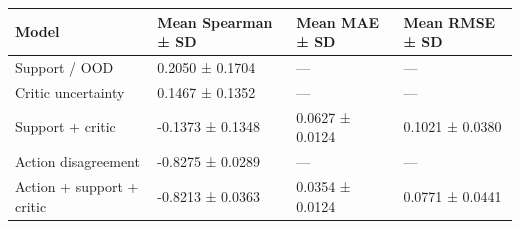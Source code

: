 \begin{tabular}{llll}
\toprule
Model & Mean Spearman ± SD & Mean MAE ± SD & Mean RMSE ± SD \\
\midrule
Support / OOD & 0.2050 ± 0.1704 & — & — \\
Critic uncertainty & 0.1467 ± 0.1352 & — & — \\
Support + critic & -0.1373 ± 0.1348 & 0.0627 ± 0.0124 & 0.1021 ± 0.0380 \\
Action disagreement & -0.8275 ± 0.0289 & — & — \\
Action + support + critic & -0.8213 ± 0.0363 & 0.0354 ± 0.0124 & 0.0771 ± 0.0441 \\
\bottomrule
\end{tabular}
